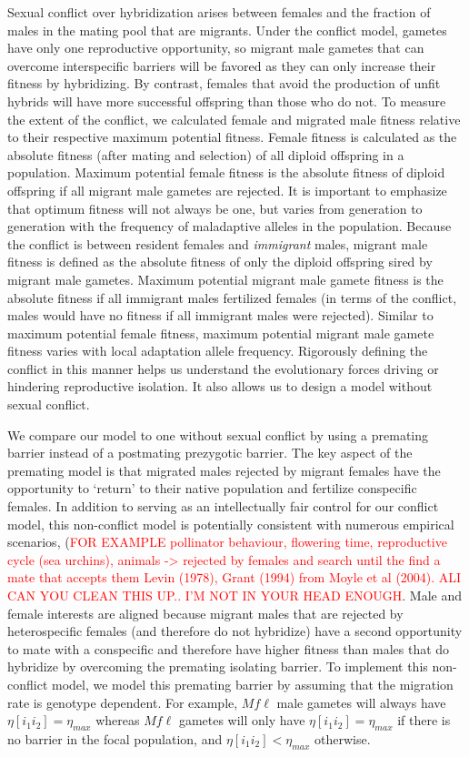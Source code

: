 \documentclass[11pt]{article}
\begin{document}
Sexual conflict over hybridization arises between females and the fraction of males in the mating pool that are migrants.  Under the conflict model, gametes have only one  reproductive opportunity, so migrant male gametes that can overcome interspecific barriers will be favored as they can only increase their fitness by hybridizing. By contrast, females that avoid the production of unfit hybrids will have more successful offspring than those who do not. To measure the extent of the conflict, we calculated female and migrated male fitness relative to their respective maximum potential fitness.  
Female fitness is calculated as the absolute fitness (after mating and selection) of all diploid offspring in a population.  Maximum potential  female fitness is the absolute fitness of diploid offspring if all migrant male gametes are rejected.  It is important to emphasize that optimum fitness will not always be one, but varies from generation to generation with the frequency of maladaptive alleles in the population.  Because the conflict is between resident females and \emph{immigrant} males, migrant male fitness is defined as the absolute fitness of only the diploid offspring sired by migrant male gametes.  Maximum potential migrant male gamete fitness is the absolute fitness if all immigrant males fertilized females (in terms of the conflict, males would have no fitness if all immigrant males were rejected).  Similar to maximum potential female fitness, maximum potential migrant male gamete fitness varies with local adaptation allele frequency. Rigorously defining the conflict in this manner helps us understand the evolutionary forces driving or hindering reproductive isolation. It also allows us to design a model without sexual conflict.

We compare our model to one without sexual conflict by using a premating barrier instead of a postmating prezygotic barrier.  The key aspect of the premating model is that migrated males rejected by migrant females have the opportunity to `return' to their native population and fertilize conspecific females. 
In addition to serving as an intellectually fair  control for our conflict model, this non-conflict model is potentially consistent with numerous empirical scenarios,  (\textcolor{red}{FOR EXAMPLE pollinator behaviour, flowering time, reproductive cycle (sea urchins), animals -> rejected by females and search until the find a mate that accepts them \textcolor{red}{Levin (1978), Grant (1994) from Moyle et al (2004). ALI CAN YOU CLEAN THIS UP.. I'M NOT IN YOUR HEAD ENOUGH}}. Male and female interests are aligned because migrant males that are rejected by heterospecific females (and therefore do not hybridize) have a second opportunity to mate with a conspecific and therefore have higher fitness than males that do hybridize by overcoming the premating isolating barrier.  To implement this non-conflict model, we model this premating barrier by assuming that the migration rate is genotype dependent.  For example, $M f \ell$ male gametes will always have $\eta[i_1 i_2] = \eta_{max}$ whereas $M f \ell$ gametes will only have $\eta[i_1 i_2] = \eta_{max}$ if there is no barrier in the focal population, and $\eta[i_1 i_2] < \eta_{max}$ otherwise.  
\end{document}
